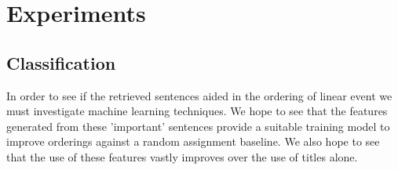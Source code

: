 \documentclass[bsc,frontabs,twoside,singlespacing,parskip,deptreport]{infthesis}     %
\begin{document}
%
%
%
%
%



\chapter{Experiments}
\section{Classification}
In order to see if the retrieved sentences aided in the  ordering of linear event we must investigate machine learning
techniques. We hope to see that the features generated from these 'important' sentences provide a suitable training model
to improve orderings against a random assignment baseline. We also hope to see that the use of these features vastly
improves over the use of titles alone.
\end{document}
